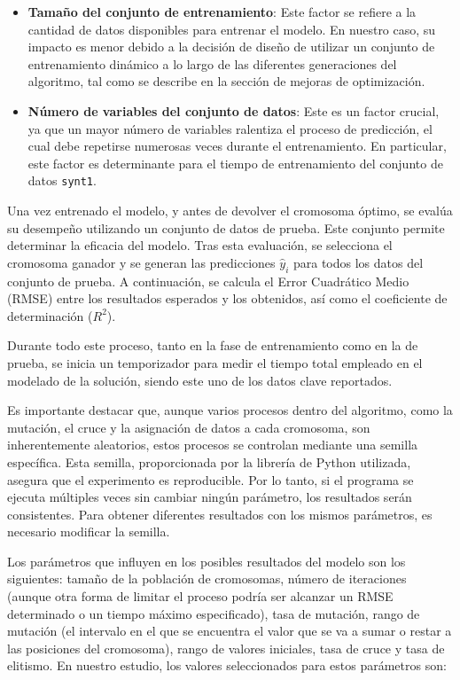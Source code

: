 \documentclass[conference,a4paper]{IEEEtran}
\begin{document}
\begin{itemize}
    \item \textbf{Tamaño del conjunto de entrenamiento}: Este factor se refiere a la cantidad de datos disponibles para entrenar el modelo. En nuestro caso, su impacto es menor debido a la decisión de diseño de utilizar un conjunto de entrenamiento dinámico a lo largo de las diferentes generaciones del algoritmo, tal como se describe en la sección de mejoras de optimización.
    
    \item \textbf{Número de variables del conjunto de datos}: Este es un factor crucial, ya que un mayor número de variables ralentiza el proceso de predicción, el cual debe repetirse numerosas veces durante el entrenamiento. En particular, este factor es determinante para el tiempo de entrenamiento del conjunto de datos \texttt{synt1}.
\end{itemize}

Una vez entrenado el modelo, y antes de devolver el cromosoma óptimo, se evalúa su desempeño utilizando un conjunto de datos de prueba. Este conjunto permite determinar la eficacia del modelo. Tras esta evaluación, se selecciona el cromosoma ganador y se generan las predicciones \(\hat{y}_i\) para todos los datos del conjunto de prueba. A continuación, se calcula el Error Cuadrático Medio (RMSE) entre los resultados esperados y los obtenidos, así como el coeficiente de determinación (\(R^2\)).

Durante todo este proceso, tanto en la fase de entrenamiento como en la de prueba, se inicia un temporizador para medir el tiempo total empleado en el modelado de la solución, siendo este uno de los datos clave reportados.

Es importante destacar que, aunque varios procesos dentro del algoritmo, como la mutación, el cruce y la asignación de datos a cada cromosoma, son inherentemente aleatorios, estos procesos se controlan mediante una semilla específica. Esta semilla, proporcionada por la librería de Python utilizada, asegura que el experimento es reproducible. Por lo tanto, si el programa se ejecuta múltiples veces sin cambiar ningún parámetro, los resultados serán consistentes. Para obtener diferentes resultados con los mismos parámetros, es necesario modificar la semilla.

Los parámetros que influyen en los posibles resultados del modelo son los siguientes: tamaño de la población de cromosomas, número de iteraciones (aunque otra forma de limitar el proceso podría ser alcanzar un RMSE determinado o un tiempo máximo especificado), tasa de mutación, rango de mutación (el intervalo en el que se encuentra el valor que se va a sumar o restar a las posiciones del cromosoma), rango de valores iniciales, tasa de cruce y tasa de elitismo. En nuestro estudio, los valores seleccionados para estos parámetros son:
\end{document}
